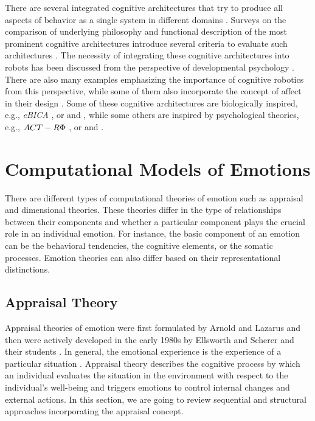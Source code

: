 \documentclass[12pt]{report}
\begin{document}
There are several integrated cognitive architectures that try to produce all
aspects of behavior as a single system in different domains
\cite{anderson:act-r, laird:soar}. Surveys on the comparison of
underlying philosophy and functional description of the most prominent cognitive
architectures introduce several criteria to evaluate such architectures
\cite{chong:cognitive-architectures-survey,langley:cognitive-architectures,
thorisson:cognitive-architectures-autonomy}. The necessity of integrating these
cognitive architectures into robots has been discussed from the perspective of
developmental psychology \cite{asada:cognitive-robotics-humanoid,
d'mello:computational-functional-modeling,
kelley:cognitive-robotics-psychology}. There are also many examples emphasizing
the importance of cognitive robotics from this perspective, while some of them
also incorporate the concept of affect in their design
\cite{cai:affective-model-psi}. Some of these cognitive architectures are
biologically inspired, e.g., \textit{eBICA}
\cite{samsonovich:emotional-biologically-architecture}, or
\cite{baxter:cognitive-architecture-hri} and
\cite{ray:self-sustaining-architecture}, while some others are inspired by
psychological theories, e.g., $\MakeUppercase{ACT-R\Phi}$
\cite{dancy:actR-physiology-affect}, or
\cite{mirolli:vygotskyan-cognitive-robotics} and
\cite{dominey:shared-intention-cognition}.

\section{Computational Models of Emotions}
There are different types of computational theories of emotion such as
appraisal and dimensional theories. These theories differ in the type of
relationships between their components and whether a particular component plays
the crucial role in an individual emotion. For instance, the basic component of
an emotion can be the behavioral tendencies, the cognitive elements, or the
somatic processes. Emotion theories can also differ based on their
representational distinctions.

\subsection{Appraisal Theory}
\label{sec:appraisal-theory}

Appraisal theories of emotion were first formulated by Arnold
\cite{arnold:emotion-personality} and Lazarus \cite{lazarus:emotion-adaptation}
and then were actively developed in the early 1980s by Ellsworth and Scherer and
their students \cite{roseman:appraisal-theory}
\cite{sander:systems-approach-appraisal} \cite{scherer:nature-function-emotion}
\cite{scherer:emotions-emergent} \cite{scherer:appraisal-processes}. In
general, the emotional experience is the experience of a particular situation
\cite{frijda:emotions}. Appraisal theory describes the cognitive process by
which an individual evaluates the situation in the environment with respect to
the individual's well-being and triggers emotions to control internal changes
and external actions. In this section, we are going to review sequential and
structural approaches incorporating the appraisal concept.
\end{document}
